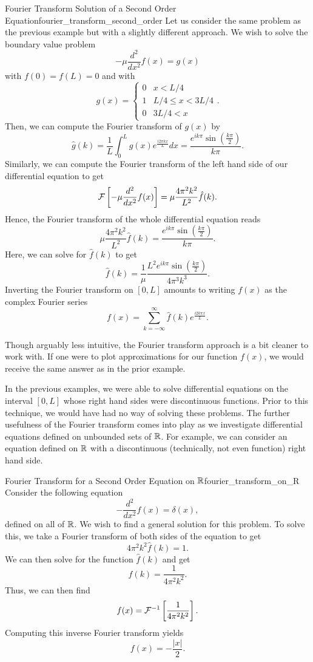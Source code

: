 \begin{ex}{Fourier Transform Solution of a Second Order Equation}{fourier_transform_second_order}
	Let us consider the same problem as the previous example but with a slightly different approach. We wish to solve the boundary value problem
	\[
	-\mu \frac{d^2}{dx^2} f(x) = g(x)
	\]
	with $f(0)=f(L)=0$ and with 
	\[
	g(x) = \begin{cases} 0 & x<L/4 \\ 1 & L/4 \leq x < 3L/4 \\ 0 & 3L/4<x \end{cases}.
	\]
	Then, we can compute the Fourier transform of $g(x)$ by
	\[
	\hat{g}(k) = \frac{1}{L}\int_0^L g(x)e^{\frac{i2\pi k x}{L}}dx =\frac{e^{ik \pi}\sin\left(\frac{k\pi}{2}\right)}{k \pi}. 
	\]
	Similarly, we can compute the Fourier transform of the left hand side of our differential equation to get
	\[
	\mathcal{F}\left[ -\mu \frac{d^2}{dx^2} f(x) \right] = \mu\frac{4\pi^2k^2}{L^2} \hat{f}(k).
	\]
	Hence, the Fourier transform of the whole differential equation reads
	\[
	\mu\frac{4\pi^2 k^2}{L^2} \hat{f}(k) = \frac{e^{ik \pi}\sin\left(\frac{k\pi}{2}\right)}{k \pi}.
	\]
	Here, we can solve for $\hat{f}(k)$ to get
	\[
	 \hat{f}(k)=\frac{1}{\mu} \frac{L^2 e^{ik \pi}\sin\left(\frac{k\pi}{2}\right)}{4\pi^3k^3}.
	\]
	Inverting the Fourier transform on $[0,L]$ amounts to writing $f(x)$ as the complex Fourier series
	\[
	\boxed{f(x) = \sum_{k=-\infty}^\infty \hat{f}(k) e^{\frac{i2k\pi x}{L}}.}
	\]
\end{ex}

\begin{remark}
	Though arguably less intuitive, the Fourier transform approach is a bit cleaner to work with.  If one were to plot approximations for our function $f(x)$, we would receive the same answer as in the prior example.
\end{remark}

In the previous examples, we were able to solve differential equations on the interval $[0,L]$ whose right hand sides were discontinuous functions.  Prior to this technique, we would have had no way of solving these problems. The further usefulness of the Fourier transform comes into play as we investigate differential equations defined on unbounded sets of $\mathbb{R}$.  For example, we can consider an equation defined on $\mathbb{R}$ with a discontinuous (technically, not even function) right hand side.

\begin{ex}{Fourier Transform for a Second Order Equation on $\mathbb{R}$}{fourier_transform_on_R}
	Consider the following equation
	\[
	-\frac{d^2}{dx^2}f(x) = \delta(x),
	\]
	defined on all of $\mathbb{R}$. We wish to find a general solution for this problem.  To solve this, we take a Fourier transform of both sides of the equation to get
	\[
	4\pi^2 k^2 \hat{f}(k) = 1.
	\]
	We can then solve for the function $\hat{f}(k)$ and get
	\[
	\hat{f}(k) = \frac{1}{4\pi^2 k^2}.
	\]
	Thus, we can then find
	\[
	f(x) = \mathcal{F}^{-1}\left[ \frac{1}{4\pi^2k^2} \right].
	\]
	Computing this inverse Fourier transform yields
	\[
	\boxed{f(x) = -\frac{|x|}{2}.}
	\]
\end{ex}
	
